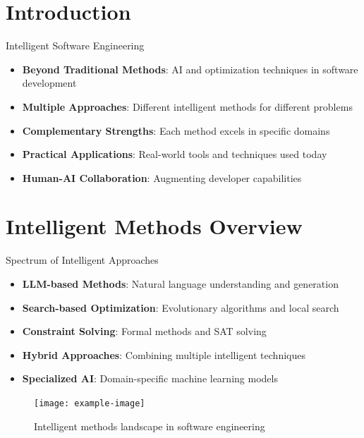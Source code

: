 \documentclass{beamer}
\begin{document}
\section{Introduction}
\begin{frame}[t]{Intelligent Software Engineering}
\begin{itemize}
\item \textbf{Beyond Traditional Methods}: AI and optimization techniques in software development
\item \textbf{Multiple Approaches}: Different intelligent methods for different problems
\item \textbf{Complementary Strengths}: Each method excels in specific domains
\item \textbf{Practical Applications}: Real-world tools and techniques used today
\item \textbf{Human-AI Collaboration}: Augmenting developer capabilities
\end{itemize}
\end{frame}

\section{Intelligent Methods Overview}
\begin{frame}[t]{Spectrum of Intelligent Approaches}
\begin{itemize}
\item \textbf{LLM-based Methods}: Natural language understanding and generation
\item \textbf{Search-based Optimization}: Evolutionary algorithms and local search
\item \textbf{Constraint Solving}: Formal methods and SAT solving
\item \textbf{Hybrid Approaches}: Combining multiple intelligent techniques
\item \textbf{Specialized AI}: Domain-specific machine learning models
\end{itemize}
\begin{figure}
\texttt{[image: example-image]}
\caption{Intelligent methods landscape in software engineering}
\end{figure}
\end{frame}
\end{document}

